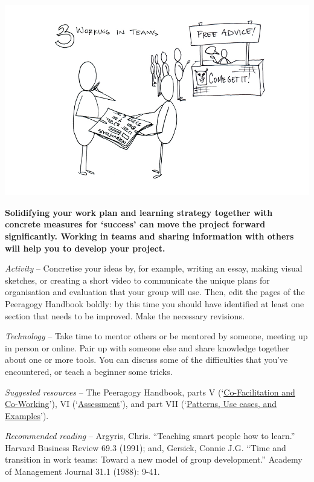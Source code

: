 \begin{center}
\includegraphics{../pictures/OpenBook-2-3.jpg}
\end{center}

\textbf{Solidifying your work plan and learning strategy together with
concrete measures for `success' can move the project forward
significantly. Working in teams and sharing information with others will
help you to develop your project.}

\emph{Activity} -- Concretise your ideas by, for example, writing an
essay, making visual sketches, or creating a short video to communicate
the unique plans for organisation and evaluation that your group will
use. Then, edit the pages of the Peeragogy Handbook boldly: by this time
you should have identified at least one section that needs to be
improved. Make the necessary revisions.

\emph{Technology} -- Take time to mentor others or be mentored by
someone, meeting up in person or online. Pair up with someone else and
share knowledge together about one or more tools. You can discuss some
of the difficulties that you've encountered, or teach a beginner some
tricks.

\emph{Suggested resources} -- The Peeragogy Handbook, parts V
(`\href{http://peeragogy.org/co-facilitation/}{Co-Facilitation and
Co-Working}'), VI
(`\href{http://peeragogy.org/assessment/}{Assessment}'), and part VII
(`\href{http://peeragogy.org/patterns-usecases/}{Patterns, Use cases,
and Examples}').

\emph{Recommended reading} -- Argyris, Chris. ``Teaching smart people
how to learn.'' Harvard Business Review 69.3 (1991); and, Gersick,
Connie J.G. ``Time and transition in work teams: Toward a new model of
group development.'' Academy of Management Journal 31.1 (1988): 9-41.

